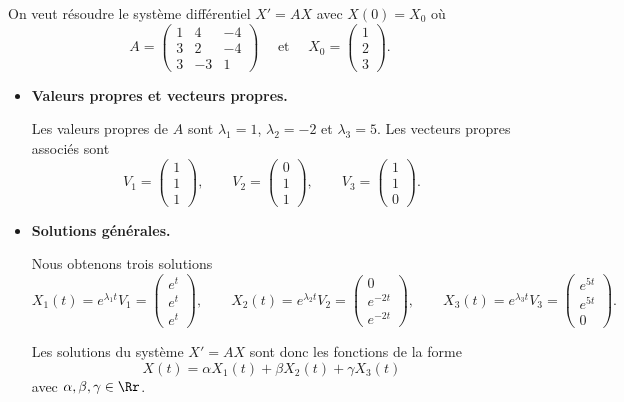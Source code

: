 \documentclass[12pt, class=report,crop=false]{standalone}
\begin{document}
\begin{exemple}
On veut résoudre le système différentiel $X'=AX$ avec $X(0) = X_0$ où
$$A = \begin{pmatrix}1&4&-4\\3&2&-4\\ 3&-3&1 \end{pmatrix}
 \quad \text{ et } \quad
 X_0 = \begin{pmatrix}1\\2\\3 \end{pmatrix}.$$
 
\begin{itemize}
  \item \textbf{Valeurs propres et vecteurs propres.}
  
   Les valeurs propres de $A$ sont $\lambda_1 = 1$, $\lambda_2 = -2$ et $\lambda_3 = 5$.
   Les vecteurs propres associés sont 
   $$V_1 = \begin{pmatrix} 1\\1\\1  \end{pmatrix}, \qquad
   V_2 = \begin{pmatrix} 0\\1\\1   \end{pmatrix}, \qquad
   V_3 = \begin{pmatrix} 1\\1\\0   \end{pmatrix}.$$
   
  \item \textbf{Solutions générales.}
  
  Nous obtenons trois solutions
  $$X_1(t) = e^{\lambda_1 t}V_1 = \begin{pmatrix} e^t \\ e^t \\ e^t \end{pmatrix}, \qquad
  X_2(t) = e^{\lambda_2 t}V_2 = \begin{pmatrix}0\\ e^{-2t}\\ e^{-2t} \end{pmatrix}, \qquad
  X_3(t) = e^{\lambda_3 t}V_3 = \begin{pmatrix}e^{5t}\\e^{5t}\\0 \end{pmatrix}.$$
  
  Les solutions du système $X'=AX$ sont donc les fonctions de la forme
  $$X(t) = \alpha X_1(t) + \beta X_2(t) + \gamma X_3(t)$$
  avec $\alpha,\beta,\gamma \in \Rr$.
    

\end{itemize}
\end{exemple}
\end{document}
